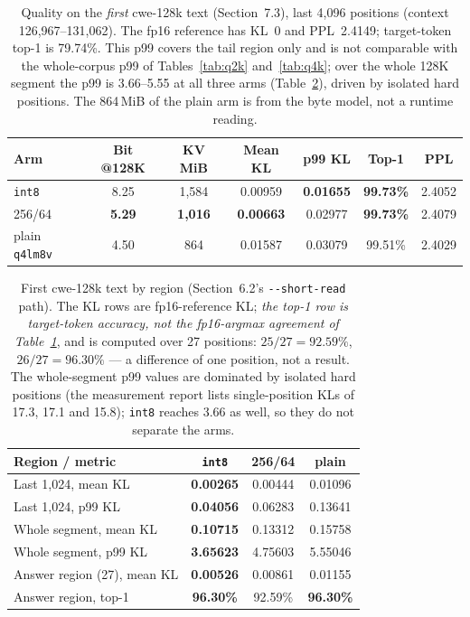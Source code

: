 \documentclass[10pt,twocolumn]{article}
\begin{document}
\begin{table}[t]
\centering
\small
\begin{tabular}{@{}lcccccc@{}}
\toprule
\textbf{Arm} & \textbf{Bit @128K} & \textbf{KV MiB} & \textbf{Mean KL} & \textbf{p99 KL} & \textbf{Top-1} & \textbf{PPL} \\
\midrule
\texttt{int8} & 8.25 & 1,584 & 0.00959 & \textbf{0.01655} & \textbf{99.73\%} & 2.4052 \\
256/64 & \textbf{5.29} & \textbf{1,016} & \textbf{0.00663} & 0.02977 & \textbf{99.73\%} & 2.4079 \\
plain \texttt{q4lm8v} & 4.50 & 864 & 0.01587 & 0.03079 & 99.51\% & 2.4029 \\
\bottomrule
\end{tabular}
\caption{Quality on the \emph{first} cwe-128k text (Section~7.3), last 4,096 positions (context 126,967--131,062). The fp16 reference has KL~0 and PPL~2.4149; target-token top-1 is 79.74\%. This p99 covers the tail region only and is not comparable with the whole-corpus p99 of Tables~\ref{tab:q2k} and~\ref{tab:q4k}; over the whole 128K segment the p99 is 3.66--5.55 at all three arms (Table~\ref{tab:regions}), driven by isolated hard positions. The 864\,MiB of the plain arm is from the byte model, not a runtime reading.}
\label{tab:q128k}
\end{table}

\begin{table}[t]
\centering
\small
\begin{tabular}{@{}lccc@{}}
\toprule
\textbf{Region / metric} & \texttt{int8} & 256/64 & plain \\
\midrule
Last 1,024, mean KL & \textbf{0.00265} & 0.00444 & 0.01096 \\
Last 1,024, p99 KL & \textbf{0.04056} & 0.06283 & 0.13641 \\
Whole segment, mean KL & \textbf{0.10715} & 0.13312 & 0.15758 \\
Whole segment, p99 KL & \textbf{3.65623} & 4.75603 & 5.55046 \\
Answer region (27), mean KL & \textbf{0.00526} & 0.00861 & 0.01155 \\
Answer region, top-1 & \textbf{96.30\%} & 92.59\% & \textbf{96.30\%} \\
\bottomrule
\end{tabular}
\caption{First cwe-128k text by region (Section~6.2's \texttt{-{}-short-read} path). The KL rows are fp16-reference KL; \emph{the top-1 row is target-token accuracy, not the fp16-argmax agreement of Table~\ref{tab:q128k}}, and is computed over 27 positions: $25/27=92.59\%$, $26/27=96.30\%$ --- a difference of one position, not a result. The whole-segment p99 values are dominated by isolated hard positions (the measurement report lists single-position KLs of 17.3, 17.1 and 15.8); \texttt{int8} reaches 3.66 as well, so they do not separate the arms.}
\label{tab:regions}
\end{table}
\end{document}
